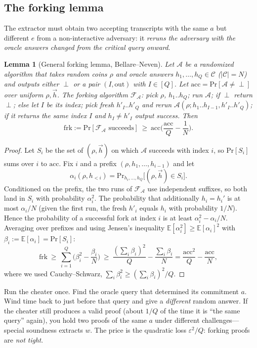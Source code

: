 \documentclass[11pt,a4paper]{report}
\theoremstyle{plain}
\newtheorem{lemma}[theorem]{Lemma}
\theoremstyle{definition}
\theoremstyle{remark}
\renewcommand{\Pr}{\mathrm{Pr}}
\begin{document}
\subsection{The forking lemma}
The extractor must obtain two accepting transcripts with the same $a$ but different $e$ from a non-interactive adversary: it \emph{reruns the adversary with the oracle answers changed from the critical query onward}.
\begin{lemma}[General forking lemma, Bellare--Neven]\label{lem:fork}
Let $\mathcal A$ be a randomized algorithm that takes random coins $\rho$ and oracle answers $h_1,\dots,h_Q\in\mathcal C$ ($|\mathcal C|=N$) and outputs either $\perp$ or a pair $(I,\text{out})$ with $I\in[Q]$. Let $\mathrm{acc}=\Pr[\mathcal A\ne\perp]$ over uniform $\rho,\vec h$. The forking algorithm $\mathcal F_{\mathcal A}$: pick $\rho$, $h_1..h_Q$; run $\mathcal A$; if $\perp$ return $\perp$; else let $I$ be its index; pick fresh $h'_I..h'_Q$ and rerun $\mathcal A(\rho;h_1..h_{I-1},h'_I..h'_Q)$; if it returns the same index $I$ and $h_I\ne h'_I$ output success. Then
\[\mathrm{frk}:=\Pr[\mathcal F_{\mathcal A}\text{ succeeds}]\ \ge\ \mathrm{acc}\Big(\frac{\mathrm{acc}}{Q}-\frac1N\Big).\]
\end{lemma}
\begin{proof}
Let $S_i$ be the set of $(\rho,\vec h)$ on which $\mathcal A$ succeeds with index $i$, so $\Pr[S_i]$ sums over $i$ to $\mathrm{acc}$. Fix $i$ and a prefix $(\rho,h_1,\dots,h_{i-1})$ and let
\[\alpha_i(\rho,h_{<i})=\Pr_{h_i,\dots,h_Q}\big[(\rho,\vec h)\in S_i\big].\]
Conditioned on the prefix, the two runs of $\mathcal F_{\mathcal A}$ use independent suffixes, so both land in $S_i$ with probability $\alpha_i^2$. The probability that additionally $h_i=h_i'$ is at most $\alpha_i/N$ (given the first run, the fresh $h'_i$ equals $h_i$ with probability $1/N$). Hence the probability of a successful fork at index $i$ is at least $\alpha_i^2-\alpha_i/N$. Averaging over prefixes and using Jensen's inequality $\mathbb E[\alpha_i^2]\ge\mathbb E[\alpha_i]^2$ with $\beta_i:=\mathbb E[\alpha_i]=\Pr[S_i]$:
\[
\mathrm{frk}\ \ge\ \sum_{i=1}^Q\Big(\beta_i^2-\frac{\beta_i}{N}\Big)\ \ge\ \frac{(\sum_i\beta_i)^2}{Q}-\frac{\sum_i\beta_i}{N}=\frac{\mathrm{acc}^2}{Q}-\frac{\mathrm{acc}}N,
\]
where we used Cauchy--Schwarz, $\sum_i\beta_i^2\ge(\sum_i\beta_i)^2/Q$.
\end{proof}
\begin{intuition}
Run the cheater once. Find the oracle query that determined its commitment $a$. Wind time back to just before that query and give a \emph{different} random answer. If the cheater still produces a valid proof (about $1/Q$ of the time it is ``the same query'' again), you hold two proofs of the same $a$ under different challenges---special soundness extracts $w$. The price is the quadratic loss $\varepsilon^2/Q$: forking proofs are \emph{not tight}.
\end{intuition}
\end{document}
